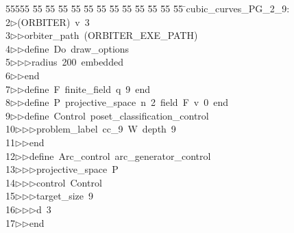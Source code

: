 %
%
\begin{tabbing}
55555 \= 55 \= 55 \= 55 \= 55 \= 55 \= 55 \= 55 \= 55 \= 55 \= 55 \= 55 \= 55 \= \>cubic\_curves\_PG\_2\_9:\\[0pt]
2\>$\triangleright$\>(ORBITER)\ v\ 3\ \\[0pt]
3\>$\triangleright$\>$\triangleright$\>orbiter\_path\ (ORBITER\_EXE\_PATH)\ \\[0pt]
4\>$\triangleright$\>$\triangleright$\>define\ Do\ draw\_options\ \\[0pt]
5\>$\triangleright$\>$\triangleright$\>$\triangleright$\>radius\ 200\ embedded\ \\[0pt]
6\>$\triangleright$\>$\triangleright$\>end\ \\[0pt]
7\>$\triangleright$\>$\triangleright$\>define\ F\ finite\_field\ q\ 9\ end\ \\[0pt]
8\>$\triangleright$\>$\triangleright$\>define\ P\ projective\_space\ n\ 2\ field\ F\ v\ 0\ end\ \\[0pt]
9\>$\triangleright$\>$\triangleright$\>define\ Control\ poset\_classification\_control\ \\[0pt]
10\>$\triangleright$\>$\triangleright$\>$\triangleright$\>problem\_label\ cc\_9\ W\ depth\ 9\ \\[0pt]
11\>$\triangleright$\>$\triangleright$\>end\ \\[0pt]
12\>$\triangleright$\>$\triangleright$\>define\ Arc\_control\ arc\_generator\_control\ \\[0pt]
13\>$\triangleright$\>$\triangleright$\>$\triangleright$\>projective\_space\ P\ \\[0pt]
14\>$\triangleright$\>$\triangleright$\>$\triangleright$\>control\ Control\ \\[0pt]
15\>$\triangleright$\>$\triangleright$\>$\triangleright$\>target\_size\ 9\ \\[0pt]
16\>$\triangleright$\>$\triangleright$\>$\triangleright$\>d\ 3\ \\[0pt]
17\>$\triangleright$\>$\triangleright$\>end\ \\[0pt]

\end{tabbing}
